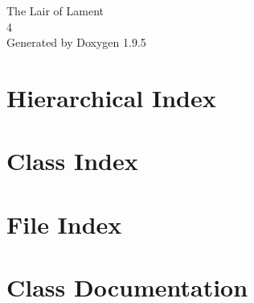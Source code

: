 \documentclass[twoside]{book}
\newcommand{\+}{\discretionary{\mbox{\scriptsize$\hookleftarrow$}}{}{}}
\newcommand{\clearemptydoublepage}{%
    \newpage{\pagestyle{empty}\cleardoublepage}%
  }
\begin{document}
  \raggedbottom
  \begin{titlepage}
  \vspace*{7cm}
  \begin{center}%
  {\Large The Lair of Lament}\\
  [1ex]\large 4 \\
  \vspace*{1cm}
  {\large Generated by Doxygen 1.9.5}\\
  \end{center}
  \end{titlepage}
  \clearemptydoublepage
  \tableofcontents
  \clearemptydoublepage
\chapter{Hierarchical Index}

\chapter{Class Index}

\chapter{File Index}

\chapter{Class Documentation}































\end{document}
